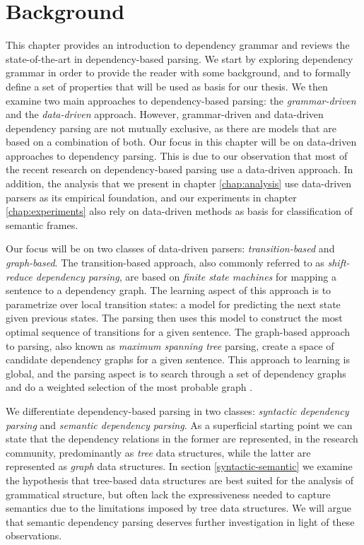 \chapter{Background}
\label{chap:background}

This chapter provides an introduction to dependency grammar and reviews the state-of-the-art in dependency-based parsing. We start by exploring dependency grammar in order to provide the reader with some background, and to formally define a set of properties that will be used as basis for our thesis. We then examine two main approaches to dependency-based parsing: the \textit{grammar-driven} and the \textit{data-driven} approach. However, grammar-driven and data-driven dependency parsing are not mutually exclusive, as there are models that are based on a combination of both. Our focus in this chapter will be on data-driven approaches to dependency parsing. This is due to our observation that most of the recent research on dependency-based parsing use a data-driven approach. In addition, the analysis that we present in chapter \ref{chap:analysis} use data-driven parsers as its empirical foundation, and our experiments in chapter \ref{chap:experiments} also rely on data-driven methods as basis for classification of semantic frames.

Our focus will be on two classes of data-driven parsers: \textit{transition-based} and \textit{graph-based}. The transition-based approach, also commonly referred to as \textit{shift-reduce dependency parsing}, are based on \textit{finite state machines} for mapping a sentence to a dependency graph. The learning aspect of this approach is to parametrize over local transition states: a model for predicting the next state given previous states. The parsing then uses this model to construct the most optimal sequence of transitions for a given sentence. The graph-based approach to parsing, also known as \textit{maximum spanning tree} parsing, create a space of candidate dependency graphs for a given sentence. This approach to learning is global, and the parsing aspect is to search through a set of dependency graphs and do a weighted selection of the most probable graph \cite{KublerEtAl:09}.

We differentiate dependency-based parsing in two classes: \textit{syntactic dependency parsing} and \textit{semantic dependency parsing}. As a superficial starting point we can state that the dependency relations in the former are represented, in the research community, predominantly as \textit{tree} data structures, while the latter are represented as \textit{graph} data structures. In section \ref{syntactic-semantic} we examine the hypothesis that tree-based data structures are best suited for the analysis of grammatical structure, but often lack the expressiveness needed to capture semantics due to the limitations imposed by tree data structures. We will argue that semantic dependency parsing deserves further investigation in light of these observations.

